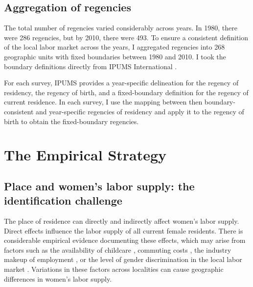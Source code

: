 \subsection{Aggregation of regencies}
\label{sec:regency_aggregation}
The total number of regencies varied considerably across years. In 1980, there were 286 regencies, but by 2010, there were 493. To ensure a consistent definition of the local labor market across the years, I aggregated regencies into 268 geographic units with fixed boundaries between 1980 and 2010. I took the boundary definitions directly from IPUMS International \citep{MinnesotaPopulationCenter2020}.

For each survey, IPUMS provides a year-specific delineation for the regency of residency, the regency of birth, and a 
fixed-boundary definition for the regency of current residence. In each survey, I use the mapping between then boundary-consistent and year-specific regencies of residency and apply it to the regency of birth to obtain the fixed-boundary regencies.






\section{The Empirical Strategy}
\label{sec:ap_empirical}

\subsection{Place and women's labor supply: the identification challenge}
\label{sec:model_explanation}


The place of residence can directly and indirectly affect women's labor supply. Direct effects influence the labor supply of all current female residents. There is considerable empirical evidence documenting these effects, which may arise from factors such as the availability of childcare \citep{Compton2014}, commuting costs \citep{LeBarbanchon2021, Farre2021}, the industry makeup of employment \citep{Olivetti2014}, or the level of gender discrimination in the local labor market \citep{Charles2018}. Variations in these factors across localities can cause geographic differences in women's labor supply.


